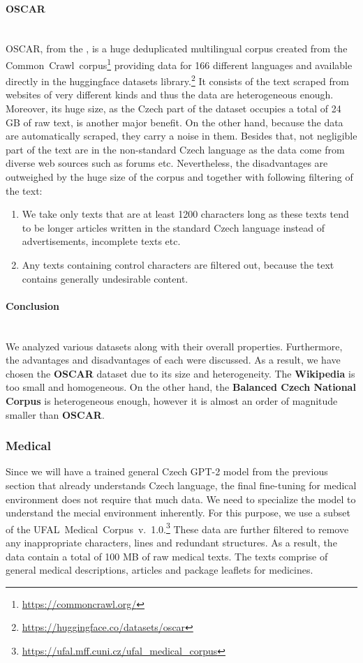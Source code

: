 \paragraph*{OSCAR} ~\\
\indent OSCAR, from the \citet{ortiz-suarez-etal-2020-monolingual}, is a huge deduplicated multilingual corpus created from the Common~Crawl~corpus\footnote[3]{\url{https://commoncrawl.org/}} providing data for 166 different languages and available directly in the huggingface datasets library.\footnote[4]{\url{https://huggingface.co/datasets/oscar}} It consists of the text scraped from websites of very different kinds and thus the data are heterogeneous enough. Moreover, its huge size, as the Czech part of the dataset occupies a total of 24 GB of raw text, is another major benefit. On the other hand, because the data are automatically scraped, they carry a noise in them. Besides that, not negligible part of the text are in the non-standard Czech language as the data come from diverse web sources such as forums etc. Nevertheless, the disadvantages are outweighed by the huge size of the corpus and together with following filtering of the text:
\begin{enumerate}
	\item We take only texts that are at least 1200 characters long as these texts tend to be longer articles written in the standard Czech language instead of advertisements, incomplete texts etc.
	\item Any texts containing control characters are filtered out, because the text contains generally undesirable content.
\end{enumerate}

\paragraph*{Conclusion} ~\\
\indent We analyzed various datasets along with their overall properties. Furthermore, the advantages and disadvantages of each were discussed. As a result, we have chosen the \textbf{OSCAR} dataset due to its size and heterogeneity. The \textbf{Wikipedia} is too small and homogeneous. On the other hand, the \textbf{Balanced Czech National Corpus} is heterogeneous enough, however it is almost an order of magnitude smaller than \textbf{OSCAR}.

\subsubsection{Medical}
Since we will have a trained general Czech GPT-2 model from the previous section that already understands Czech language, the final fine-tuning for medical environment does not require that much data. We need to specialize the model to understand the mecial environment inherently. For this purpose, we use a subset of the UFAL~Medical~Corpus~v.\ 1.0.\footnote[5]{\url{https://ufal.mff.cuni.cz/ufal\_medical\_corpus}} These data are further filtered to remove any inappropriate characters, lines and redundant structures. As a result, the data contain a total of 100 MB of raw medical texts. The texts comprise of general medical descriptions, articles and package leaflets for medicines.

